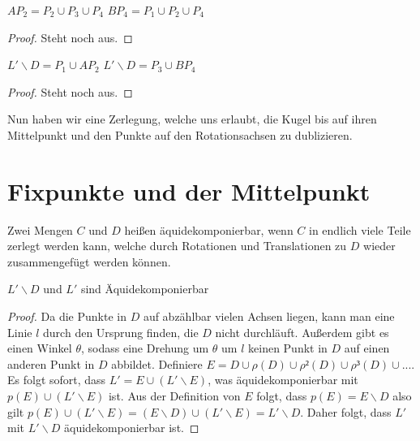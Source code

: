 \begin{lemma}
\begin{lemma} \label{lemma:rot_zerlegte_mengen}
$AP_2=P_2\cup P_3\cup P_4$
$BP_4=P_1\cup P_2\cup P_4$
\end{lemma}
\begin{proof} 
Steht noch aus.
\end{proof}

\begin{lemma}[Verdopplung L'\D] \label{lemma:verdopplung_L_D}
$L'\backslash D=P_1\cup AP_2$
$L'\backslash D=P_3\cup BP_4$
\end{lemma}
\begin{proof} 
Steht noch aus.
\end{proof}

Nun haben wir eine Zerlegung, welche uns erlaubt, die Kugel bis auf ihren Mittelpunkt und den Punkte auf den Rotationsachsen zu dublizieren.

\section{Fixpunkte und der Mittelpunkt}

\begin{definition}[Äquidekomponierbar] \label{def:aequidekomponierbar} 
Zwei Mengen $C$ und $D$ heißen äquidekomponierbar, wenn $C$ in endlich viele Teile zerlegt werden kann, welche durch
Rotationen und Translationen zu $D$ wieder zusammengefügt werden können.
\end{definition}

\begin{lemma} \label{lem:aequidekomponierbarkeit}
$L'\backslash D$ und $L'$ sind Äquidekomponierbar
\end{lemma}
\begin{proof}
Da die Punkte in $D$ auf abzählbar vielen Achsen liegen, kann man eine Linie $l$ durch den Ursprung finden, die $D$ nicht durchläuft.
Außerdem gibt es einen Winkel $\theta$, sodass eine Drehung um $\theta$ um $l$ keinen Punkt in $D$ auf einen anderen Punkt in $D$ abbildet.
Definiere $E=D\cup \rho(D)\cup \rho²(D)\cup \rho³(D)\cup...$. Es folgt sofort, dass
$L'=E\cup (L' \backslash E)$, was äquidekomponierbar mit $p(E) \cup (L' \backslash E)$ ist.
Aus der Definition von $E$ folgt, dass $p(E)=E\backslash D$ also gilt $p(E)\cup (L'\backslash E)=(E\backslash D)\cup (L'\backslash E)=
L'\backslash D$. Daher folgt, dass $L'$ mit $L'\backslash D$ äquidekomponierbar ist.
\end{proof}


\end{lemma}
